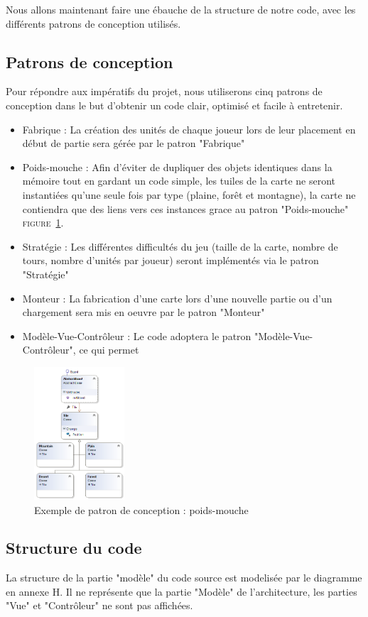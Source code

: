 Nous allons maintenant faire une ébauche de la structure de notre code, avec les différents patrons de conception utilisés.

\subsection{Patrons de conception}

Pour répondre aux impératifs du projet, nous utiliserons cinq patrons de conception dans le but d'obtenir un code clair, optimisé et facile à entretenir. 

\begin{itemize}
  \item Fabrique : La création des unités de chaque joueur lors de leur placement en début de partie sera gérée par le patron "Fabrique"
  \item Poids-mouche : Afin d'éviter de dupliquer des objets identiques dans la mémoire tout en gardant un code simple, les tuiles de la carte ne seront instantiées qu'une seule fois par type (plaine, forêt et montagne), la carte ne contiendra que des liens vers ces instances grace au patron "Poids-mouche" \textsc{figure~\ref{poids-mouche}}.
  \item Stratégie : Les différentes difficultés du jeu (taille de la carte, nombre de tours, nombre d'unités par joueur) seront implémentés via le patron "Stratégie"
  \item Monteur : La fabrication d'une carte lors d'une nouvelle partie ou d'un chargement sera mis en oeuvre par le patron "Monteur"
  \item Modèle-Vue-Contrôleur : Le code adoptera le patron "Modèle-Vue-Contrôleur", ce qui permet
\end{itemize}

\begin{figure}[!h]
\centering
\label{poids-mouche}
\includegraphics[width=0.3\textwidth]{img/PoidsMouche.png}
\caption{Exemple de patron de conception : poids-mouche}
\end{figure}

\subsection{Structure du code}

La structure de la partie "modèle" du code source est modelisée par le diagramme en annexe H. Il ne représente que la partie "Modèle" de l'architecture, les parties "Vue" et "Contrôleur" ne sont pas affichées.


